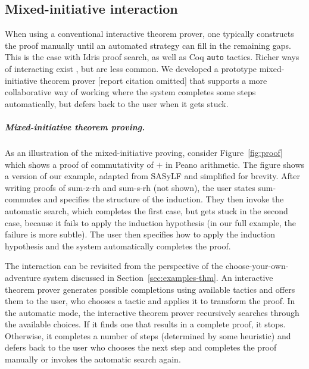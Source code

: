 \documentclass[anonymous, a4paper,UKenglish,cleveref, autoref, thm-restate]{lipics-v2021}
\newcommand{\ident}[1]{\textsf{#1}}
\begin{document}
\subsection{Mixed-initiative interaction}
When using a conventional interactive theorem prover, one typically constructs the proof manually until an
automated strategy can fill in the remaining gaps. This is the case with Idris proof search,
as well as Coq \texttt{auto} tactics. Richer ways of interacting exist \cite{lowe-1997-xbarnacle},
but are less common. We developed a prototype mixed-initiative theorem prover [report citation
omitted] that supports a more collaborative way of working where the system completes some
steps automatically, but defers back to the user when it gets stuck.

\subparagraph{Mixed-initiative theorem proving.}
As an illustration of the mixed-initiative proving, consider Figure~\ref{fig:proof} which
shows a proof of commutativity of $+$ in Peano arithmetic. The figure shows a version of our example,
adapted from SASyLF \cite{aldrich-2008-sasylf,aldrich-2025-sum} and simplified for brevity.
After writing proofs of \ident{sum-z-rh} and \ident{sum-s-rh} (not shown), the user states
\ident{sum-commutes} and specifies the structure of the induction. They then invoke the automatic
search, which completes the first case, but gets stuck in the second case, because it fails
to apply the induction hypothesis (in our full example, the failure is more subtle). The user
then specifies how to apply the induction hypothesis and the system automatically completes the
proof.

The interaction can be revisited from the perspective of the choose-your-own-adventure system
discussed in Section~\ref{sec:examples-thm}. An interactive theorem prover generates possible
completions using available tactics and offers them to the user, who chooses a tactic and
applies it to transform the proof. In the automatic mode, the interactive theorem prover
recursively searches through the available choices. If it finds one that results in a complete
proof, it stops. Otherwise, it completes a number of steps (determined by some heuristic)
and defers back to the user who chooses the next step and completes the proof manually or
invokes the automatic search again.
\end{document}
